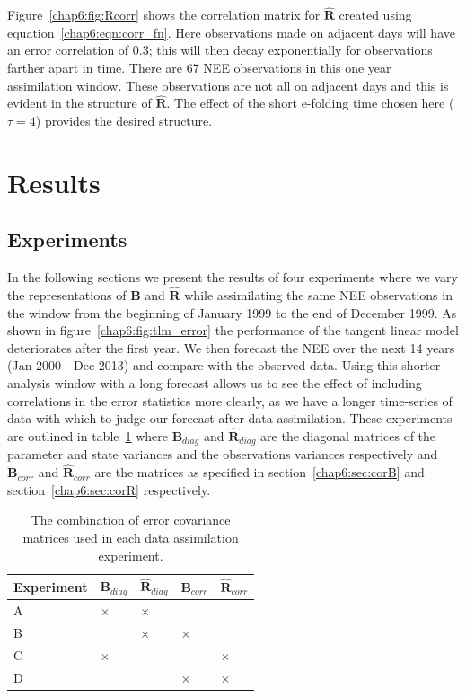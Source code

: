 Figure~\ref{chap6:fig:Rcorr} shows the correlation matrix for $\hat{\mathbf{R}}$ created using equation~\eqref{chap6:eqn:corr_fn}. Here observations made on adjacent days will have an error correlation of 0.3; this will then decay exponentially for observations farther apart in time. There are 67 NEE observations in this one year assimilation window. These observations are not all on adjacent days and this is evident in the structure of $\hat{\mathbf{R}}$. The effect of the short e-folding time chosen here ($\tau=4$) provides the desired structure. 

\section{Results} \label{chap6:sec:results}

\subsection{Experiments} \label{chap6:sec:exps}

In the following sections we present the results of four experiments where we vary the representations of $\textbf{B}$ and $\hat{\mathbf{R}}$ while assimilating the same NEE observations in the window from the beginning of January 1999 to the end of December 1999. As shown in figure~\ref{chap6:fig:tlm_error} the performance of the tangent linear model deteriorates after the first year. We then forecast the NEE over the next 14 years (Jan 2000 - Dec 2013) and compare with the observed data. Using this shorter analysis window with a long forecast allows us to see the effect of including correlations in the error statistics more clearly, as we have a longer time-series of data with which to judge our forecast after data assimilation. These experiments are outlined in table~\ref{chap6:table:exps_tab} where $\textbf{B}_{diag}$ and $\hat{\mathbf{R}}_{diag}$ are the diagonal matrices of the parameter and state variances and the observations variances respectively and $\textbf{B}_{corr}$ and $\hat{\mathbf{R}}_{corr}$ are the matrices as specified in section~\ref{chap6:sec:corB} and section~\ref{chap6:sec:corR} respectively.

\begin{table}[ht] 
\begin{center}
	\begin{tabular}{| l | l | l | l | l |}
	\hline
	Experiment & $\textbf{B}_{diag}$ & $\hat{\mathbf{R}}_{diag}$ & $\textbf{B}_{corr}$ &
	$\hat{\mathbf{R}}_{corr}$ \\ \hline
	A & $\times$ & $\times$ & & \\ \hline
	B & & $\times$ & $\times$ & \\ \hline
	C & $\times$ & & & $\times$ \\ \hline
	D & & & $\times$ & $\times$ \\ 
	\hline
	\end{tabular}
	\caption{The combination of error covariance matrices used in each data assimilation experiment.}
	\label{chap6:table:exps_tab}
\end{center} 
\end{table}

